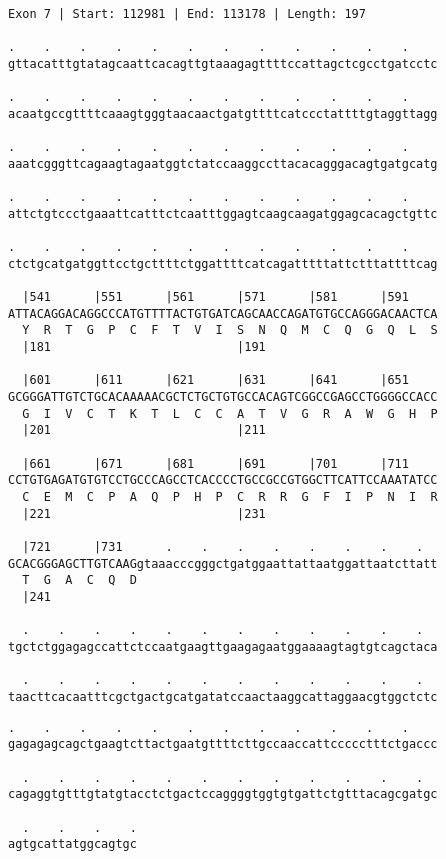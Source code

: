 \documentclass{article}
\begin{document}
\begin{Verbatim}[fontfamily=courier]
Exon 7 | Start: 112981 | End: 113178 | Length: 197

.    .    .    .    .    .    .    .    .    .    .    .    
gttacatttgtatagcaattcacagttgtaaagagttttccattagctcgcctgatcctc

.    .    .    .    .    .    .    .    .    .    .    .    
acaatgccgttttcaaagtgggtaacaactgatgttttcatccctattttgtaggttagg

.    .    .    .    .    .    .    .    .    .    .    .    
aaatcgggttcagaagtagaatggtctatccaaggccttacacagggacagtgatgcatg

.    .    .    .    .    .    .    .    .    .    .    .    
attctgtccctgaaattcatttctcaatttggagtcaagcaagatggagcacagctgttc

.    .    .    .    .    .    .    .    .    .    .    .    
ctctgcatgatggttcctgcttttctggattttcatcagatttttattctttattttcag

  |541      |551      |561      |571      |581      |591    
ATTACAGGACAGGCCCATGTTTTACTGTGATCAGCAACCAGATGTGCCAGGGACAACTCA
  Y  R  T  G  P  C  F  T  V  I  S  N  Q  M  C  Q  G  Q  L  S
  |181                          |191                        

  |601      |611      |621      |631      |641      |651    
GCGGGATTGTCTGCACAAAAACGCTCTGCTGTGCCACAGTCGGCCGAGCCTGGGGCCACC
  G  I  V  C  T  K  T  L  C  C  A  T  V  G  R  A  W  G  H  P
  |201                          |211                        

  |661      |671      |681      |691      |701      |711    
CCTGTGAGATGTGTCCTGCCCAGCCTCACCCCTGCCGCCGTGGCTTCATTCCAAATATCC
  C  E  M  C  P  A  Q  P  H  P  C  R  R  G  F  I  P  N  I  R
  |221                          |231                        

  |721      |731      .    .    .    .    .    .    .    .  
GCACGGGAGCTTGTCAAGgtaaacccgggctgatggaattattaatggattaatcttatt
  T  G  A  C  Q  D                                          
  |241                                                      

  .    .    .    .    .    .    .    .    .    .    .    .  
tgctctggagagccattctccaatgaagttgaagagaatggaaaagtagtgtcagctaca

  .    .    .    .    .    .    .    .    .    .    .    .  
taacttcacaatttcgctgactgcatgatatccaactaaggcattaggaacgtggctctc

\end{Verbatim}
\newpage
\begin{Verbatim}[fontfamily=courier]
  .    .    .    .    .    .    .    .    .    .    .    .  
gagagagcagctgaagtcttactgaatgttttcttgccaaccattccccctttctgaccc

  .    .    .    .    .    .    .    .    .    .    .    .  
cagaggtgtttgtatgtacctctgactccaggggtggtgtgattctgtttacagcgatgc

  .    .    .    .
agtgcattatggcagtgc
\end{Verbatim}
\end{document}
